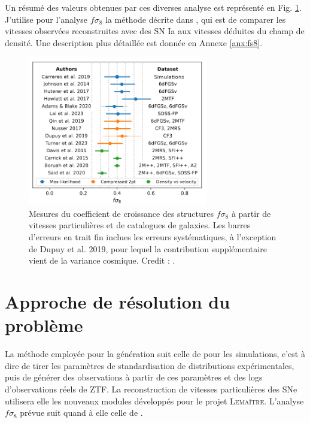 \documentclass{book}
\def\lemaitre{\textsc{Lemaître}\xspace}
\begin{document}
Un résumé des valeurs obtenues par ces diverses analyse est représenté en Fig. \ref{fig:carreres_11}. J'utilise pour l'analyse $f\sigma_8$ la méthode décrite dans \cite{boruah_cosmic_2020,stahl_peculiar-velocity_2021}, qui est de comparer les vitesses observées reconstruites avec des SN Ia aux vitesses déduites du champ de densité. Une description plus détaillée est donnée en Annexe \ref{anx:fs8}.

\begin{figure}[h]
    \centering
    \includegraphics[width=0.7\textwidth]{figures/Carreres_fig_11.png}
    \caption{Mesures du coefficient de croissance des structures $f\sigma_8$ à partir de vitesses particulières et de catalogues de galaxies. Les barres d'erreurs en trait fin inclues les erreurs systématiques, à l'exception de Dupuy et al. 2019, pour lequel la contribution supplémentaire vient de la variance cosmique. Credit : 
    \cite{carreres_growth-rate_2023}.}
    \label{fig:carreres_11}
\end{figure}

\section{Approche de résolution du problème}


La méthode employée pour la génération suit celle de \cite{carreres_growth-rate_2023} pour les simulations, c'est à dire de tirer les paramètres de standardisation de distributions expérimentales, puis de générer des observations à partir de ces paramètres et des logs d'observations réels de ZTF. La reconstruction de vitesses particulières des SNe utilisera elle les nouveaux modules développés pour le projet \lemaitre. L'analyse $f\sigma_8$ prévue suit quand à elle celle de \cite{boruah_cosmic_2020,stahl_peculiar-velocity_2021}.
\end{document}
